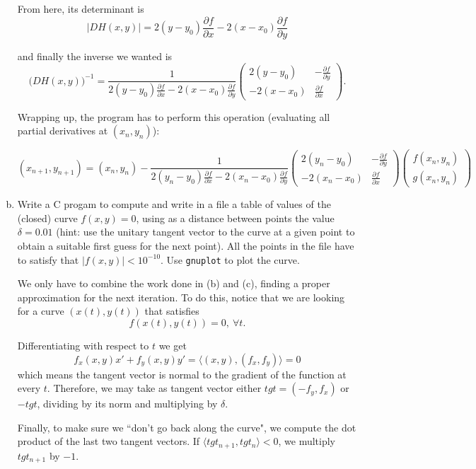 \documentclass{article}
\begin{document}
\begin{enumerate}[a)]
From here, its determinant is
$$|DH(x,y)|=2(y-y_0)\frac{\partial f}{\partial x} - 2(x-x_0)\frac{\partial f}{\partial y}$$

and finally the inverse we wanted is
$$\big(DH(x,y)\big)^{-1}=\frac{1}{2(y-y_0)\frac{\partial f}{\partial x} - 2(x-x_0)\frac{\partial f}{\partial y}}
\begin{pmatrix}
	2(y-y_0) & -\frac{\partial f}{\partial y}\\
	-2(x-x_0) & \frac{\partial f}{\partial x}
\end{pmatrix}.$$

Wrapping up, the program has to perform this operation (evaluating all partial derivatives at $(x_n,y_n)$):

$$(x_{n+1},y_{n+1})=(x_n,y_n)
-\frac{1}{2(y_n-y_0)\frac{\partial f}{\partial x} - 2(x_n-x_0)\frac{\partial f}{\partial y}}
\begin{pmatrix}
	2(y_n-y_0) & -\frac{\partial f}{\partial y}\\
	-2(x_n-x_0) & \frac{\partial f}{\partial x}
\end{pmatrix}
\begin{pmatrix}
	f(x_n,y_n)\\ 
	g(x_n,y_n)
\end{pmatrix}$$


\item Write a C progam to compute and write in a file a table of values of the (closed) curve $f(x,y)=0$, using as a distance between points the value $\delta=0.01$ (hint: use the unitary tangent vector to the curve at a given point to obtain a suitable first guess for the next point). All the points in the file have to satisfy that $|f(x,y)|<10^{-10}$. Use \texttt{gnuplot} to plot the curve.

We only have to combine the work done in (b) and (c), finding a proper approximation for the next iteration. To do this, notice that we are looking for a curve $(x(t),y(t))$ that satisfies 
$$f(x(t),y(t))=0,\ \forall t.$$

Differentiating with respect to $t$ we get
$$f_x(x,y)x'+f_y(x,y)y'=\langle(x,y),(f_x,f_y)\rangle=0$$
which means the tangent vector is normal to the gradient of the function at every $t$. Therefore, we may take as tangent vector either $tgt=(-f_y,f_x)$ or $-tgt$, dividing by its norm and multiplying by $\delta$. 

Finally, to make sure we ``don't go back along the curve", we compute the dot product of the last two tangent vectors. If $\langle tgt_{n+1},tgt_n\rangle<0$, we multiply $tgt_{n+1}$ by $-1$.


\end{enumerate}
\end{document}
